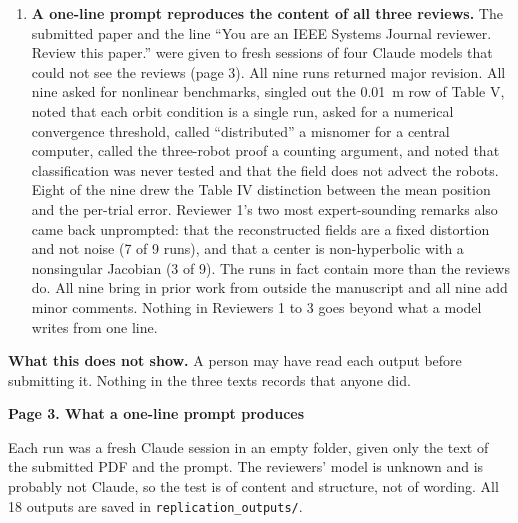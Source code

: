 \documentclass[11pt,letterpaper]{article}
\newcommand{\q}[1]{``#1''}
\newcommand{\lead}[1]{\textbf{#1}}
\begin{document}
\begin{enumerate}[resume]
\item \lead{A one-line prompt reproduces the content of all three reviews.} The submitted paper and the line \q{You are an IEEE Systems Journal reviewer. Review this paper.} were given to fresh sessions of four Claude models that could not see the reviews (page 3). All nine runs returned major revision. All nine asked for nonlinear benchmarks, singled out the 0.01~m row of Table V, noted that each orbit condition is a single run, asked for a numerical convergence threshold, called \q{distributed} a misnomer for a central computer, called the three-robot proof a counting argument, and noted that classification was never tested and that the field does not advect the robots. Eight of the nine drew the Table IV distinction between the mean position and the per-trial error. Reviewer 1's two most expert-sounding remarks also came back unprompted: that the reconstructed fields are a fixed distortion and not noise (7 of 9 runs), and that a center is non-hyperbolic with a nonsingular Jacobian (3 of 9). The runs in fact contain more than the reviews do. All nine bring in prior work from outside the manuscript and all nine add minor comments. Nothing in Reviewers 1 to 3 goes beyond what a model writes from one line.

\end{enumerate}

\vspace{2pt}
{\footnotesize\textbf{What this does not show.} A person may have read each output before submitting it. Nothing in the three texts records that anyone did.\par}

\newcommand{\m}[1]{\textbf{\textcolor{accent}{#1}}}

{\sffamily\bfseries\Large Page 3. What a one-line prompt produces}\par
\vspace{2pt}
{\fontsize{9}{10.8}\selectfont Each run was a fresh Claude session in an empty folder, given only the text of the submitted PDF and the prompt. The reviewers' model is unknown and is probably not Claude, so the test is of content and structure, not of wording. All 18 outputs are saved in \texttt{replication\_outputs/}.\par}
\end{document}
